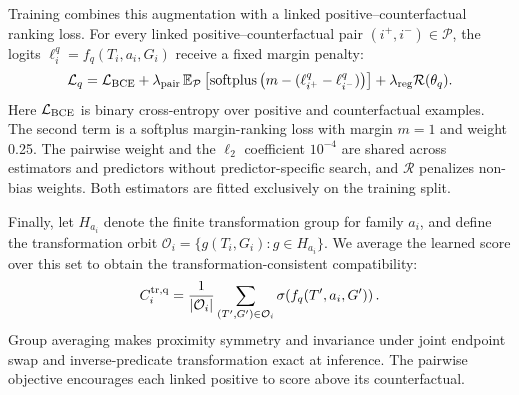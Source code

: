 Training combines this augmentation with a linked positive--counterfactual ranking loss. For every linked positive--counterfactual pair $(i^+,i^-)\in\mathcal P$, the logits $\ell_i^q=f_q(T_i,a_i,G_i)$ receive a fixed margin penalty:
\begin{equation}
\begin{aligned}
\mathcal L_q=\mathcal L_{\rm BCE}
+\lambda_{\rm pair}\,\mathbb E_{\mathcal P}
\left[\operatorname{softplus}
\left(m-(\ell^q_{i^+}-\ell^q_{i^-})\right)\right]
+\lambda_{\rm reg}\mathcal R(\theta_q).
\end{aligned}
\end{equation}
Here $\mathcal L_{\rm BCE}$ is binary cross-entropy over positive and counterfactual examples. The second term is a softplus margin-ranking loss with margin $m=1$ and weight 0.25. The pairwise weight and the $\ell_2$ coefficient $10^{-4}$ are shared across estimators and predictors without predictor-specific search, and $\mathcal R$ penalizes non-bias weights. Both estimators are fitted exclusively on the training split. 

Finally, let $H_{a_i}$ denote the finite transformation group for family $a_i$, and define the transformation orbit $\mathcal O_i=\{g(T_i,G_i):g\in H_{a_i}\}$. We average the learned score over this set to obtain the transformation-consistent compatibility:
\begin{equation}
C_i^{\rm tr,q}=\frac{1}{|\mathcal O_i|}
\sum_{(T',G')\in\mathcal O_i} \sigma\!\left(f_q(T',a_i,G')\right).
\label{eq:algebra-projection}
\end{equation}
Group averaging makes proximity symmetry and invariance under joint endpoint swap and inverse-predicate transformation exact at inference. The pairwise objective encourages each linked positive to score above its counterfactual.

